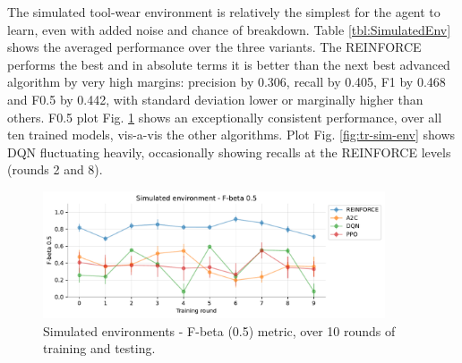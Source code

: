 \documentclass[a4paper, 12pt]{article}
\begin{document}
The simulated tool-wear environment is relatively the simplest for the agent to learn, even with added noise and chance of breakdown. Table \ref{tbl:SimulatedEnv} shows the averaged performance over the three variants. The REINFORCE performs the best and in absolute terms it is better than the next best advanced algorithm by very high margins: precision by 0.306, recall by 0.405, F1 by 0.468 and F0.5 by 0.442, with standard deviation lower or marginally higher than others. F0.5 plot Fig. \ref{fig:FbetaSimulated} shows an exceptionally consistent performance, over all ten trained models, vis-a-vis the other algorithms. Plot Fig. \ref{fig:tr-sim-env} shows DQN fluctuating heavily, occasionally showing recalls at the REINFORCE levels (rounds 2 and 8).
\begin{figure}[h]
	\centering
	\includegraphics[width=0.9\textwidth]{Simulated_F05.pdf}  
	\caption{Simulated environments - F-beta (0.5) metric, over 10 rounds of training and testing.}
	\label{fig:FbetaSimulated}
\end{figure}
\end{document}
